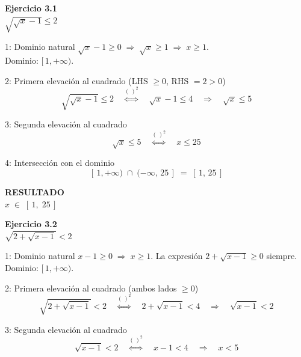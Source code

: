 \documentclass[letterpaper, 11pt]{article}
\newcommand{\exheader}[2]{%
    \begin{tcolorbox}[colback=azulFuerte!12, colframe=azulFuerte,
        arc=8pt, boxrule=1.5pt, enhanced]
        {\large\textbf{\color{azulFuerte}Ejercicio #1}} \\[0.4em]
        \centering\LARGE $\displaystyle #2$
    \end{tcolorbox}
    \smallskip}
\newcommand{\resultado}[1]{%
    \begin{tcolorbox}[colback=azulFuerte, colframe=azulFuerte, colupper=white,
        arc=8pt, boxrule=1.5pt, enhanced, drop shadow={black!12}]
        \centering\large\textbf{RESULTADO} \\[0.4em]
        \LARGE $\displaystyle #1$
    \end{tcolorbox}}
\begin{document}
\exheader{3.1}{\sqrt{\sqrt{x} - 1} \leq 2}

\begin{paso}{1: Dominio natural}
$\sqrt{x} - 1 \geq 0 \;\Rightarrow\; \sqrt{x} \geq 1 \;\Rightarrow\; x \geq 1$.\\
Dominio: $[\,1,+\infty)$.
\end{paso}

\begin{paso}{2: Primera elevación al cuadrado (LHS $\geq 0$, RHS $= 2 > 0$)}
\[
    \sqrt{\sqrt{x}-1} \leq 2
    \quad\stackrel{(\,)^2}{\Longleftrightarrow}\quad
    \sqrt{x} - 1 \leq 4
    \quad\Longrightarrow\quad
    \sqrt{x} \leq 5
\]
\end{paso}

\begin{paso}{3: Segunda elevación al cuadrado}
\[
    \sqrt{x} \leq 5
    \quad\stackrel{(\,)^2}{\Longleftrightarrow}\quad
    x \leq 25
\]
\end{paso}

\begin{paso}{4: Intersección con el dominio}
\[
    [\,1,+\infty) \;\cap\; (-\infty,\,25\,] \;=\; [\,1,\,25\,]
\]
\end{paso}

\resultado{x \;\in\; [\,1,\;25\,]}

\bigskip

\exheader{3.2}{\sqrt{2 + \sqrt{x-1}} < 2}

\begin{paso}{1: Dominio natural}
$x - 1 \geq 0 \;\Rightarrow\; x \geq 1$. La expresión $2+\sqrt{x-1} \geq 0$ siempre.\\
Dominio: $[\,1,+\infty)$.
\end{paso}

\begin{paso}{2: Primera elevación al cuadrado (ambos lados $\geq 0$)}
\[
    \sqrt{2+\sqrt{x-1}} < 2
    \quad\stackrel{(\,)^2}{\Longleftrightarrow}\quad
    2 + \sqrt{x-1} < 4
    \quad\Longrightarrow\quad
    \sqrt{x-1} < 2
\]
\end{paso}

\begin{paso}{3: Segunda elevación al cuadrado}
\[
    \sqrt{x-1} < 2
    \quad\stackrel{(\,)^2}{\Longleftrightarrow}\quad
    x - 1 < 4
    \quad\Longrightarrow\quad
    x < 5
\]
\end{paso}
\end{document}
